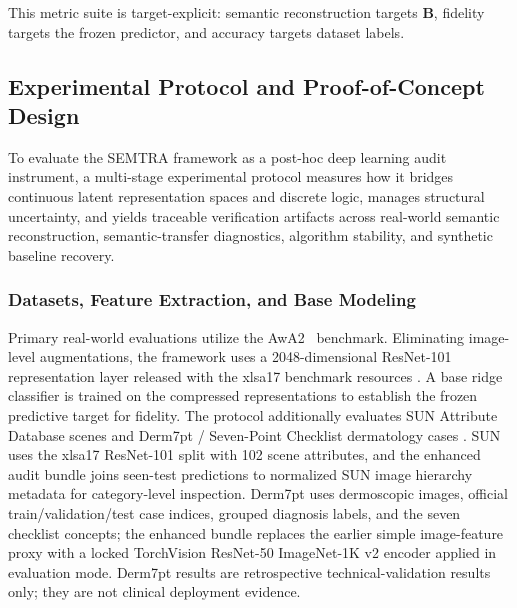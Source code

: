 \documentclass[make,article,submit,pdftex,moreauthors]{Definitions/mdpi}
\newcommand{\matB}{\mathbf{B}}
\begin{document}
This metric suite is target-explicit: semantic reconstruction targets $\matB$, fidelity targets the frozen predictor, and accuracy targets dataset labels.

\subsection{Experimental Protocol and Proof-of-Concept Design}
\label{subsec:protocol}

To evaluate the SEMTRA framework as a post-hoc deep learning audit instrument, a multi-stage experimental protocol measures how it bridges continuous latent representation spaces and discrete logic, manages structural uncertainty, and yields traceable verification artifacts across real-world semantic reconstruction, semantic-transfer diagnostics, algorithm stability, and synthetic baseline recovery.

\subsubsection{Datasets, Feature Extraction, and Base Modeling}
\label{subsubsec:datasets_base_modeling}

Primary real-world evaluations utilize the AwA2~\cite{AwA2Website} benchmark. Eliminating image-level augmentations, the framework uses a 2048-dimensional ResNet-101 representation layer released with the xlsa17 benchmark resources \cite{Xian2019AwA2}. A base ridge classifier is trained on the compressed representations to establish the frozen predictive target for fidelity. The protocol additionally evaluates SUN Attribute Database scenes \cite{Patterson2014SUN,SUNAttributesWebsite} and Derm7pt / Seven-Point Checklist dermatology cases \cite{Kawahara2019Derm7pt,Derm7ptWebsite}. SUN uses the xlsa17 ResNet-101 split with 102 scene attributes, and the enhanced audit bundle joins seen-test predictions to normalized SUN image hierarchy metadata for category-level inspection. Derm7pt uses dermoscopic images, official train/validation/test case indices, grouped diagnosis labels, and the seven checklist concepts; the enhanced bundle replaces the earlier simple image-feature proxy with a locked TorchVision ResNet-50 ImageNet-1K v2 encoder applied in evaluation mode. Derm7pt results are retrospective technical-validation results only; they are not clinical deployment evidence.
\end{document}
